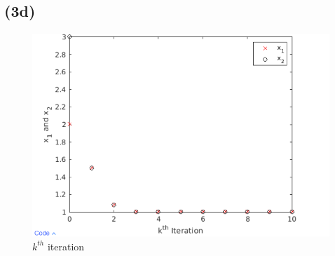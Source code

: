\documentclass{article}
\begin{document}
\subsection*{(3d)}

\begin{figure}[H]
    \centering
    \includegraphics[width = .75\linewidth]{images/hw04q3d.PNG}
    \caption{$k^{th}$ iteration}
    \label{fig:my_label}
\end{figure}
\end{document}
